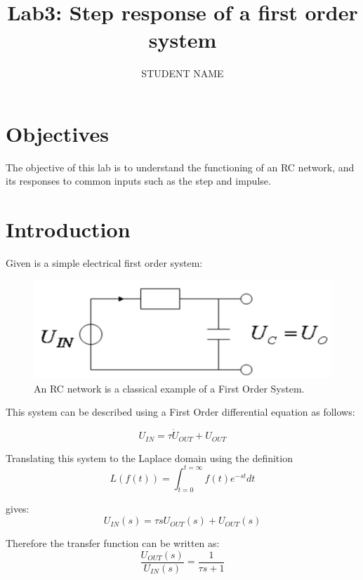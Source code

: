 \documentclass[11pt,letterpaper]{article}
\author{STUDENT NAME}
\title{Lab3: Step response of a first order system}
\begin{document}
\maketitle

\section{Objectives}

The objective of this lab is to understand the functioning of an RC network, and its responses to common inputs such as the step and impulse.

\section{Introduction}

Given is a simple electrical first order system:
\begin{figure}
\centering
\includegraphics[width=0.7\linewidth]{Lab3_RC_Network}
\caption{An RC network is a classical example of a First Order System.}
\label{fig:Lab3_RC_Network}
\end{figure}
 
This system can be described using a First Order differential equation as follows:

\begin{equation} \label{Eqn:StepResponseFirstOrderSystem1}
U_{IN} = \tau \dot{U}_{OUT} + U_{OUT}
\end{equation}
 

Translating this system to the Laplace domain using the definition 
\begin{equation} \label{Eqn:StepResponseFirstOrderSystem2}
L(f(t)) = \int_{t=0}^{t = \infty} f(t)e^{-st} dt
\end{equation}

gives:
\begin{equation} \label{Eqn:StepResponseFirstOrderSystem3}
U_{IN}(s) = \tau s U_{OUT}(s) + U_{OUT}(s)
\end{equation}

Therefore the transfer function can be written as:
\begin{equation} \label{Eqn:StepResponseFirstOrderSystem4}
\dfrac{U_{OUT}(s)}{U_{IN}(s)} = \dfrac{1}{\tau s + 1}
\end{equation}
 	 	
\end{document}
